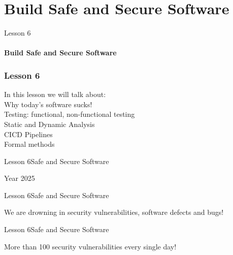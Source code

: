 \documentclass[aspectratio=1610]{beamer}
\begin{document}
\section{Build Safe and Secure Software}

\begin{frame}
\begin{center}
\Huge Lesson 6\\~\\
\textbf{Build Safe and Secure Software}
\end{center}
\end{frame}


\begin{frame}
\frametitle{Lesson 6}
\Huge In this lesson we will talk about:\\
\huge
 \alert{Why today's software sucks!}\\
 \alert{Testing: functional, non-functional testing}\\
 \alert{Static and Dynamic Analysis}\\
 \alert{CICD Pipelines}\\
 \alert{Formal methods}
\end{frame}


\begin{frame}{Lesson 6}{Safe and Secure Software}
\Huge
\begin{center}
Year 2025
\end{center}
\end{frame}


\begin{frame}{Lesson 6}{Safe and Secure Software}
\Huge
\begin{center}
We are drowning in security vulnerabilities, software defects and bugs! 
\end{center}
\end{frame}


\begin{frame}
\end{frame}


\begin{frame}{Lesson 6}{Safe and Secure Software}
\Huge
\begin{center}
More than 100 security vulnerabilities every single day!
\end{center}
\end{frame}
\end{document}
